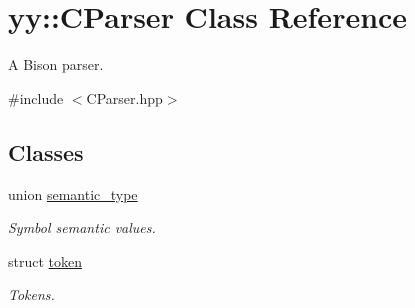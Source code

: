 \hypertarget{classyy_1_1CParser}{\section{yy\-:\-:C\-Parser Class Reference}
\label{classyy_1_1CParser}
}


A Bison parser.  




{\ttfamily \#include $<$C\-Parser.\-hpp$>$}

\subsection*{Classes}
\begin{DoxyCompactItemize}
\item 
union \hyperlink{unionyy_1_1CParser_1_1semantic__type}{semantic\-\_\-type}
\begin{DoxyCompactList}\small\item\em Symbol semantic values. \end{DoxyCompactList}\item 
struct \hyperlink{structyy_1_1CParser_1_1token}{token}
\begin{DoxyCompactList}\small\item\em Tokens. \end{DoxyCompactList}\end{DoxyCompactItemize}
